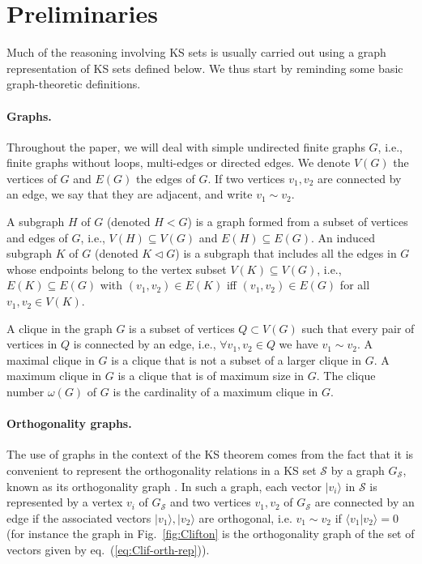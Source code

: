 \documentclass[twocolumn, a4paper, superscriptaddress,nofootinbib, accepted=2020-08-07, hyperref]{quantumarticle}
\begin{document}
\section{Preliminaries}\label{sec:prel}
Much of the reasoning involving KS sets is usually carried out using a graph representation of KS sets defined below. We thus start by reminding some basic graph-theoretic definitions.

\paragraph*{Graphs.}
Throughout the paper, we will deal with simple undirected finite graphs $G$, i.e., finite graphs without loops, multi-edges or directed edges. We denote $V(G)$ the vertices of $G$ and $E(G)$ the edges of $G$. If two vertices $v_1,v_2$ are connected by an edge, we say that they are adjacent, and write $v_1\sim v_2$.


A subgraph $H$ of $G$ (denoted $H < G$) is a graph formed from a subset of vertices and edges of $G$, i.e., $V(H) \subseteq V(G)$ and $E(H) \subseteq E(G)$. An induced subgraph $K$ of $G$ (denoted $K \lhd G$) is a subgraph that includes all the edges in $G$ whose endpoints belong to the vertex subset $V(K) \subseteq V(G)$, i.e., $E(K) \subseteq E(G)$ with $(v_1, v_2) \in E(K)$ iff $(v_1, v_2) \in E(G)$ for all $v_1, v_2 \in V(K)$.  

A clique in the graph $G$ is a subset of vertices $Q \subset V(G)$ such that every pair of vertices in $Q$ is connected by an edge, i.e., $\forall v_1, v_2 \in Q$ we have $v_1 \sim v_2$. A maximal clique in $G$ is a clique that is not a subset of a larger clique in $G$. 
A maximum clique in $G$ is a clique that is of maximum size in $G$. The clique number $\omega(G)$ of $G$ is the cardinality of a maximum clique in $G$.
 
\paragraph*{Orthogonality graphs.}
The use of graphs in the context of the KS theorem comes from the fact that it is convenient to represent the orthogonality relations in a KS set $\mathcal{S}$ by a graph $G_\mathcal{S}$, known as its orthogonality graph \cite{CSW10, CSW14}. In such a graph, each vector $|v_i\rangle$ in $\mathcal{S}$ is represented by a vertex $v_i$ of $ G_{\mathcal{S}}$ and two vertices $v_1, v_2$ of $G_{\mathcal{S}}$ are connected by an edge if the associated vectors $|v_1 \rangle, |v_2 \rangle$ are orthogonal, i.e. $v_1\sim v_2$ if $\langle v_1 | v_2 \rangle = 0$ (for instance the graph in Fig.~\ref{fig:Clifton} is the orthogonality graph of the set of vectors given by eq.~(\ref{eq:Clif-orth-rep})).
\end{document}
